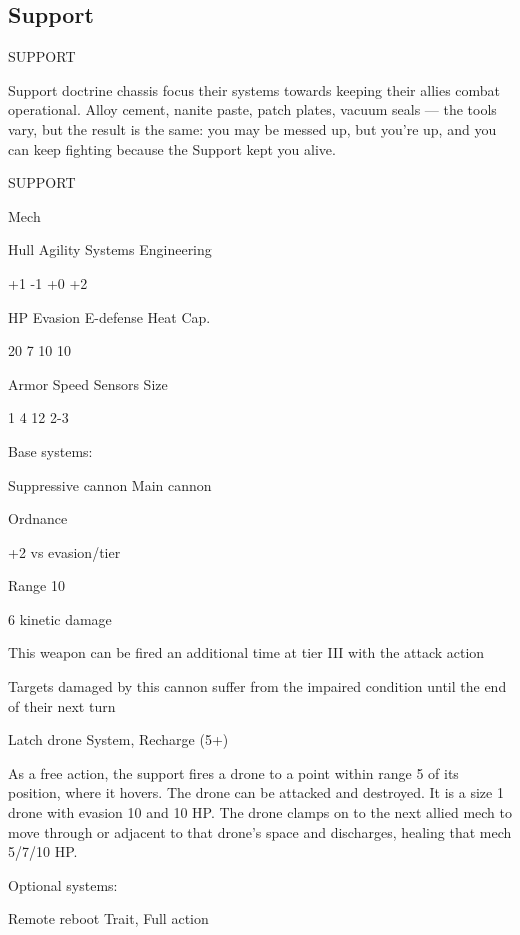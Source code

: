 \subsection{Support}

                                               SUPPORT  

Support doctrine chassis focus their systems towards keeping their allies combat operational.  
Alloy cement, nanite paste, patch plates, vacuum seals — the tools vary, but the result is the  
same: you may be messed up, but you’re up, and you can keep fighting because the Support  
kept you alive. 
 

 SUPPORT 

 Mech 

 Hull       Agility      Systems       Engineering 

 +1         -1           +0            +2 

 HP         Evasion      E-defense     Heat Cap. 

 20         7            10            10 

 Armor      Speed        Sensors       Size 

 1          4            12            2-3 

Base systems:  

Suppressive cannon  
Main cannon
 
Ordnance
 
+2 vs evasion/tier
 
Range 10
 
6 kinetic damage
 
This weapon can be fired an additional time at tier III with the attack action
 
Targets damaged by this cannon suffer from the impaired condition until the end of their next  
turn
 

Latch drone  
System, Recharge (5+)
 
As a free action, the support fires a drone to a point within range 5 of its position, where it  
hovers. The drone can be attacked and destroyed. It is a size 1 drone with evasion 10 and 10 HP.  
The drone clamps on to the next allied mech to move through or adjacent to that drone’s space  
and discharges, healing that mech 5/7/10 HP.
 

Optional systems:
 
Remote reboot  
Trait, Full action
 

                                                                                                          


